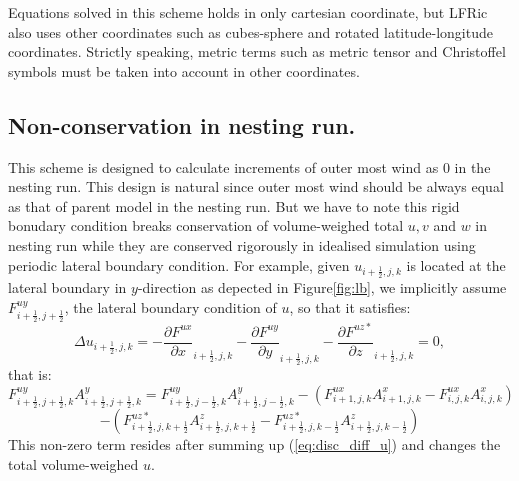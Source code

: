 \documentclass[9pt]{jsarticle}
\begin{document}
Equations solved in this scheme holds in only cartesian coordinate, but LFRic also uses other coordinates such as cubes-sphere and rotated latitude-longitude coordinates.
Strictly speaking, metric terms such as metric tensor and Christoffel symbols must be taken into account in other coordinates.

\subsection{Non-conservation in nesting run.}

This scheme is designed to calculate increments of outer most wind as 0 in the nesting run.
This design is natural since outer most wind should be always equal as that of parent model in the nesting run.
But we have to note this rigid bonudary condition breaks conservation of volume-weighed total $u, v$ and $w$ in nesting run while they are conserved rigorously in idealised simulation using periodic lateral boundary condition.
For example, given $u_{i+\frac{1}{2},j,k}$ is located at the lateral boundary in $y$-direction as depected in Figure\ref{fig:lb}, we implicitly assume $F^{uy}_{i+\frac{1}{2},j+\frac{1}{2}}$, the lateral boundary condition of $u$, so that it satisfies:
\begin{equation}
  \Delta u_{i+\frac{1}{2},j,k} =
  -\frac{\partial F^{ux}}{\partial x}_{i+\frac{1}{2},j,k}
  -\frac{\partial F^{uy}}{\partial y}_{i+\frac{1}{2},j,k}
  -\frac{\partial F^{uz*}}{\partial z}_{i+\frac{1}{2},j,k}
  = 0,
\end{equation}
that is:
\begin{equation*}
  F^{uy}_{i+\frac{1}{2},j+\frac{1}{2},k} A^{y}_{i+\frac{1}{2},j+\frac{1}{2},k} =
      F^{uy}_{i+\frac{1}{2},j-\frac{1}{2},k} A^{y}_{i+\frac{1}{2},j-\frac{1}{2},k}
    - \left(
      F^{ux}_{i+1,j,k} A^{x}_{i+1,j,k} - F^{ux}_{i,j,k} A^{x}_{i,j,k}
      \right)
\end{equation*}
\begin{equation}
    - \left(
      F^{uz*}_{i+\frac{1}{2},j,k+\frac{1}{2}} A^{z}_{i+\frac{1}{2},j,k+\frac{1}{2}} - F^{uz*}_{i+\frac{1}{2},j,k-\frac{1}{2}} A^{z}_{i+\frac{1}{2},j,k-\frac{1}{2}}
      \right)
\end{equation}
This non-zero term resides after summing up (\ref{eq:disc_diff_u}) and changes the total volume-weighed $u$.
\end{document}
